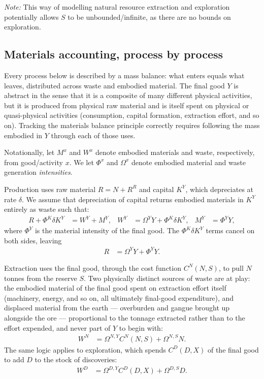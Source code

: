 \textit{Note:} This way of modelling natural resource extraction and exploration potentially allows $S$ to be unbounded/infinite, as there are no bounds on exploration. 


\subsection{Materials accounting, process by process}
\label{sec:sp:setup:materialaccounting}
Every process below is described by a mass balance: what enters equals what leaves, distributed across waste and embodied material. The final good $Y$ is abstract in the sense that it is a composite of many different physical activities, but it is produced from physical raw material and is itself spent on physical or quasi-physical activities (consumption, capital formation, extraction effort, and so on). Tracking the materials balance principle correctly requires following the mass embodied in $Y$ through each of those uses.

Notationally, let $M^x$ and $W^x$ denote embodied materials and waste, respectively, from good/activity $x$. We let $\Phi^x$ and $\Omega^x$ denote embodied material and waste generation \emph{intensities}.

Production uses raw material $R=N+R^R$ and capital $K^Y$, which depreciates at rate $\delta$. We assume that depreciation of capital returns embodied materials in $K^Y$ entirely as waste such that:
\begin{align}
    R+\Phi^K\delta K^Y &= W^Y+M^Y, &
W^Y &= \Omega^YY+\Phi^K\delta K^Y, &
M^Y &= \Phi^YY,
\label{eq:sp:setup:production}
\end{align}
where $\Phi^Y$ is the material intensity of the final good. The $\Phi^K\delta K^Y$ terms cancel on both sides, leaving
\begin{align}
R &= \Omega^YY+\Phi^YY.
\label{eq:sp:setup:production-reduced}
\end{align}


 Extraction uses the final good, through the cost function $C^N(N,S)$, to pull $N$ tonnes from the reserve $S$. Two physically distinct sources of waste are at play: the embodied material of the final good spent on extraction effort itself (machinery, energy, and so on, all ultimately final-good expenditure), and displaced material from the earth --- overburden and gangue brought up alongside the ore --- proportional to the tonnage extracted rather than to the effort expended, and never part of $Y$ to begin with:
\begin{align}
W^N &= \Omega^{N,Y}C^N(N,S)+\Omega^{N,S}N.
\label{eq:sp:setup:extraction}
\end{align}
The same logic applies to exploration, which spends $C^D(D,X)$ of the final good to add $D$ to the stock of discoveries:
\begin{align}
W^D &= \Omega^{D,Y}C^D(D,X)+\Omega^{D,S}D.
\label{eq:sp:setup:exploration}
\end{align}

